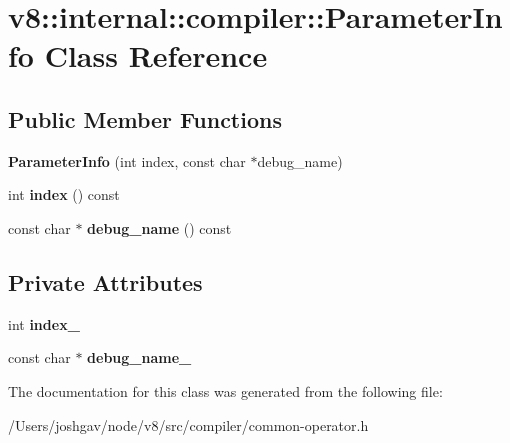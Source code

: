 \hypertarget{classv8_1_1internal_1_1compiler_1_1_parameter_info}{}\section{v8\+:\+:internal\+:\+:compiler\+:\+:Parameter\+Info Class Reference}
\label{classv8_1_1internal_1_1compiler_1_1_parameter_info}
\subsection*{Public Member Functions}
\begin{DoxyCompactItemize}
\item 
{\bfseries Parameter\+Info} (int index, const char $\ast$debug\+\_\+name)\hypertarget{classv8_1_1internal_1_1compiler_1_1_parameter_info_a344991550d3757b461766b420fd63f4b}{}\label{classv8_1_1internal_1_1compiler_1_1_parameter_info_a344991550d3757b461766b420fd63f4b}

\item 
int {\bfseries index} () const \hypertarget{classv8_1_1internal_1_1compiler_1_1_parameter_info_a4e60d11471a048eb6a0d39b6ddafcb26}{}\label{classv8_1_1internal_1_1compiler_1_1_parameter_info_a4e60d11471a048eb6a0d39b6ddafcb26}

\item 
const char $\ast$ {\bfseries debug\+\_\+name} () const \hypertarget{classv8_1_1internal_1_1compiler_1_1_parameter_info_ac629d757d276d7941a7a4eddf58a6b0d}{}\label{classv8_1_1internal_1_1compiler_1_1_parameter_info_ac629d757d276d7941a7a4eddf58a6b0d}

\end{DoxyCompactItemize}
\subsection*{Private Attributes}
\begin{DoxyCompactItemize}
\item 
int {\bfseries index\+\_\+}\hypertarget{classv8_1_1internal_1_1compiler_1_1_parameter_info_a5c85aaa52d4440b84cb8aeb04b076309}{}\label{classv8_1_1internal_1_1compiler_1_1_parameter_info_a5c85aaa52d4440b84cb8aeb04b076309}

\item 
const char $\ast$ {\bfseries debug\+\_\+name\+\_\+}\hypertarget{classv8_1_1internal_1_1compiler_1_1_parameter_info_ad7ed63250d46b71968215add889e265d}{}\label{classv8_1_1internal_1_1compiler_1_1_parameter_info_ad7ed63250d46b71968215add889e265d}

\end{DoxyCompactItemize}


The documentation for this class was generated from the following file\+:\begin{DoxyCompactItemize}
\item 
/\+Users/joshgav/node/v8/src/compiler/common-\/operator.\+h\end{DoxyCompactItemize}
